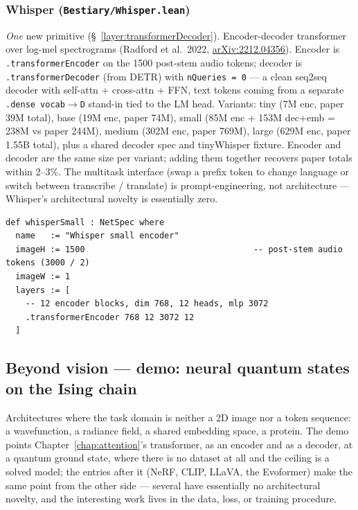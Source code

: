 \subsubsection*{Whisper (\texttt{Bestiary/Whisper.lean})}
\emph{One} new primitive (\S~\ref{layer:transformerDecoder}). Encoder-decoder transformer over log-mel
spectrograms (Radford et al.\ 2022,
\href{https://arxiv.org/abs/2212.04356}{arXiv:2212.04356}). Encoder is
\texttt{.transformerEncoder} on the 1500 post-stem audio tokens;
decoder is \texttt{.transformerDecoder} (from DETR) with
\texttt{nQueries = 0} --- a clean seq2seq decoder with self-attn +
cross-attn + FFN, text tokens coming from a separate
\texttt{.dense vocab$\to$D} stand-in tied to the LM head. Variants:
tiny (7M enc, paper 39M total), base (19M enc, paper 74M), small
(85M enc + 153M dec+emb = 238M vs paper 244M), medium (302M enc,
paper 769M), large (629M enc, paper 1.55B total), plus a shared
decoder spec and tinyWhisper fixture. Encoder and decoder are the
same size per variant; adding them together recovers paper totals
within 2--3\%. The multitask interface (swap a prefix token to change
language or switch between transcribe / translate) is
prompt-engineering, not architecture --- Whisper's architectural
novelty is essentially zero.

\begin{verbatim}
def whisperSmall : NetSpec where
  name   := "Whisper small encoder"
  imageH := 1500                                  -- post-stem audio tokens (3000 / 2)
  imageW := 1
  layers := [
    -- 12 encoder blocks, dim 768, 12 heads, mlp 3072
    .transformerEncoder 768 12 3072 12
  ]
\end{verbatim}

\subsection{Beyond vision --- demo: neural quantum states on the Ising chain}
\label{sec:bestiary_beyond}

Architectures where the task domain is neither a 2D image nor a token
sequence: a wavefunction, a radiance field, a shared embedding space, a
protein. The demo points Chapter~\ref{chap:attention}'s transformer, as an
encoder and as a decoder, at a quantum ground state, where there is no
dataset at all and the ceiling is a solved model; the entries after it
(NeRF, CLIP, LLaVA, the Evoformer) make the same point from the other side
--- several have essentially no architectural novelty, and the interesting
work lives in the data, loss, or training procedure.

